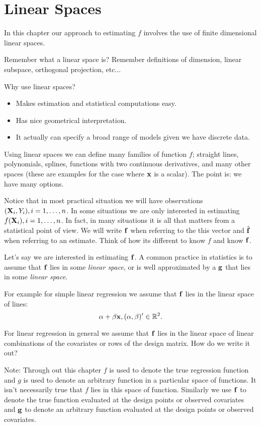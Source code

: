 \section{Linear Spaces}
In this chapter our approach to estimating $f$ involves the use of
finite dimensional linear spaces. 

Remember what a linear space is? Remember definitions of dimension,
linear subspace, orthogonal projection, etc...

Why use linear spaces? 
\begin{itemize}
\item Makes estimation and statistical computations easy.
\item Has nice geometrical interpretation.
\item It actually can specify a broad range of models given we have 
  discrete data.
\end{itemize}

Using linear spaces we can define many families of function $f$; 
straight lines, polynomials, splines, functions with two continuous
derivatives, and many other spaces (these are examples for the case
where ${\mathbf x}$ is a scalar). The point is: we have many options.

Notice that in most practical situation we will have  observations
$({\mathbf X}_i,Y_i), i=1,\dots,n$. In some situations we are only interested
in estimating $f({\mathbf X}_i),i=1,\dots,n$. In fact, in many situations it
is all that matters from a statistical point of view. We will write
${\mathbf f}$ when referring to the this vector and $\hat{{\mathbf f}}$ when referring to
an estimate. Think of how its different to know $f$ and know ${\mathbf f}$.

Let's say we are interested in estimating ${\mathbf f}$. A common practice in
statistics is to assume that ${\mathbf f}$ lies in some {\it linear space}, or
is well approximated by a ${\mathbf g}$ that lies in some {\it linear space}. 

For example for simple linear regression we assume that ${\mathbf f}$ lies in the
linear space 
of lines:
\[
\alpha + \beta {\mathbf x}, (\alpha,\beta)' \in {\mathbb R}^2.
\]

For linear regression in general we assume that ${\mathbf f}$ lies in the
linear space of linear combinations of the covariates or rows of the
design matrix. How do we write it out?

Note: Through out this chapter $f$ is used to denote the true
regression function and $g$ is used to denote an arbitrary function in
a particular space of functions. It isn't necessarily true that $f$ lies
in this space of function. Similarly we use ${\mathbf f}$ to denote the true function
evaluated at the design points or observed covariates and ${\mathbf g}$ to
denote an arbitrary function evaluated at the design points or
observed covariates. 


